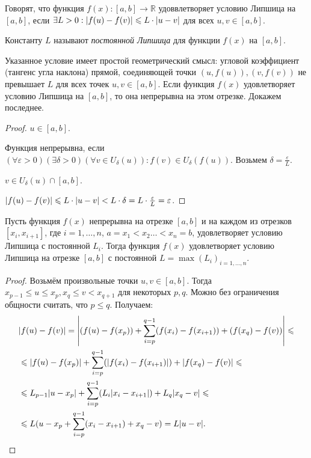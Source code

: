 
\begin{definition}
	Говорят, что функция $f(x): [a, b] \to \mathbb{R}$ удоввлетворяет условию Липшица на $[a, b]$, если $\exists L > 0: \abs{f(u) - f(v)} \leqslant L \cdot \abs{u - v}$ для всех $u, v \in [a, b]$. 
	
	Константу $L$ называют \textit{постоянной Липшица} для функции $f(x)$ на $[a, b]$.
\end{definition}

\begin{utv}
	Указанное условие имеет простой геометрический смысл: угловой коэффициент (тангенс угла наклона) прямой, соединяющей точки $(u, f(u)), (v, f(v))$ не превышает $L$ для всех точек $u, v \in [a, b]$. 
	Если функция $f(x)$ удовлетворяет условию Липшица на $[a, b]$, то она непрерывна на этом отрезке. Докажем последнее. 
\end{utv}
\begin{proof}
	$u \in [a, b]$.
	
	Функция непрерывна, если $(\forall \varepsilon > 0) (\exists \delta > 0) (\forall v \in U_{\delta}(u)): f(v) \in U_{\delta}(f(u))$. Возьмем $\delta = \frac{\varepsilon}{L}$.
	
	$v \in U_{\delta}(u) \cap [a, b]$. 
	
	$\abs{f(u) - f(v)} \leqslant L \cdot \abs{u - v} < L \cdot \delta = L \cdot \frac{\varepsilon}{L} = \varepsilon$. 
\end{proof}

\begin{theorem} \label{LipshForAll}
	Пусть функция $f(x)$ непрерывна на отрезке $[a, b]$ и на каждом из отрезков $[x_i, x_{i + 1}]$, где $i = 1, \dotsc, n$, $a = x_1 < x_2 \dotsc < x_n = b$, удовлетворяет условию Липшица с постоянной $L_i$. Тогда функция $f(x)$ удовлетворяет условию Липшица на отрезке $[a, b]$ с постоянной $L = \max(L_i)_{i = 1, \dotsc, n}$. 
\end{theorem}
\begin{proof}
	Возьмём произвольные точки $u, v \in [a, b]$. Тогда $x_{p - 1} \leqslant u \leqslant x_p, x_q \leqslant v < x_{q + 1}$ для некоторых $p, q$. Можно без ограничения общности считать, что $p \leqslant q$. Получаем:
	\begin{align*}
		&\abs{f(u) - f(v)} = \abs{(f(u) - f(x_p)) + \sum_{i = p}^{q - 1}(f(x_i) - f(x_{i + 1})) + (f(x_q) - f(v))} \leqslant \\
		&\leqslant \abs{f(u) - f(x_p)} + \sum_{i = p}^{q - 1}(\abs{f(x_i) - f(x_{i + 1})}) + \abs{f(x_q) - f(v)} \leqslant \\
		&\leqslant L_{p - 1} \abs{u - x_p} + \sum_{i = p}^{q - 1}(L_i \abs{x_i - x_{i + 1}}) + L_q \abs{x_q - v} \leqslant \\
		&\leqslant L(u - x_p + \sum_{i = p}^{q - 1}(x_i - x_{i + 1}) + x_q - v) = L\abs{u - v}. 
	\end{align*}
\end{proof}


